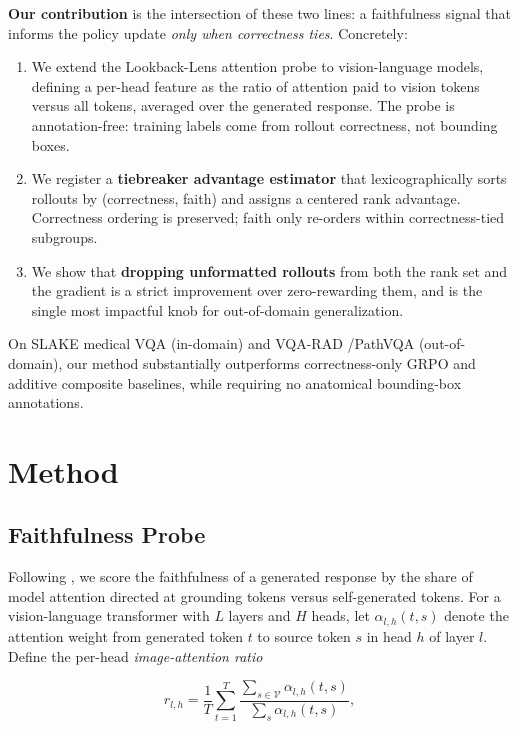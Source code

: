 \documentclass[11pt]{article}
\begin{document}
\textbf{Our contribution} is the intersection of these two lines: a
faithfulness signal that informs the policy update \emph{only when
correctness ties}. Concretely:

\begin{enumerate}
\itemsep0em
\item We extend the Lookback-Lens attention probe \citep{lookback-lens}
  to vision-language models, defining a per-head feature as the ratio of
  attention paid to vision tokens versus all tokens, averaged over the
  generated response. The probe is annotation-free: training labels come
  from rollout correctness, not bounding boxes.
\item We register a \textbf{tiebreaker advantage estimator} that
  lexicographically sorts rollouts by (correctness, faith) and assigns a
  centered rank advantage. Correctness ordering is preserved; faith only
  re-orders within correctness-tied subgroups.
\item We show that \textbf{dropping unformatted rollouts} from both the
  rank set and the gradient is a strict improvement over zero-rewarding
  them, and is the single most impactful knob for out-of-domain
  generalization.
\end{enumerate}

On SLAKE \citep{slake} medical VQA (in-domain) and VQA-RAD
\citep{vqarad}/PathVQA \citep{pathvqa} (out-of-domain), our method
substantially outperforms correctness-only GRPO and additive composite
baselines, while requiring no anatomical bounding-box annotations.

\section{Method}

\subsection{Faithfulness Probe}

Following \citet{lookback-lens}, we score the faithfulness of a generated
response by the share of model attention directed at grounding tokens
versus self-generated tokens. For a vision-language transformer with $L$
layers and $H$ heads, let $\alpha_{l,h}(t, s)$ denote the attention weight
from generated token $t$ to source token $s$ in head $h$ of layer $l$.
Define the per-head \emph{image-attention ratio}

\begin{equation}
r_{l,h} = \frac{1}{T} \sum_{t=1}^{T} \frac{\sum_{s \in \mathcal{V}} \alpha_{l,h}(t,s)}{\sum_{s} \alpha_{l,h}(t,s)},
\label{eq:probe-feature}
\end{equation}
\end{document}
